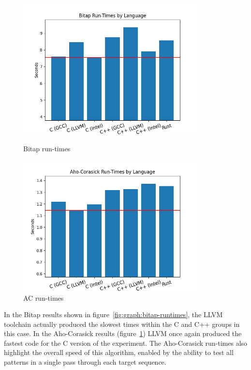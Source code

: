 \begin{figure}[ht]
    \centering
    \begin{minipage}[t]{0.45\textwidth}
        \centering
        \includegraphics[width=0.85\textwidth]{figures/algorithm_runtimes-shift_or.png}
        \caption{Bitap run-times}
        \label{fig:graph:bitap-runtimes}
    \end{minipage}\hfill
    \begin{minipage}[t]{0.45\textwidth}
        \centering
        \includegraphics[width=0.85\textwidth]{figures/algorithm_runtimes-aho_corasick.png}
        \caption{AC run-times}
        \label{fig:graph:ac-runtimes}
    \end{minipage}
\end{figure}

In the Bitap results shown in figure~\ref{fig:graph:bitap-runtimes}, the LLVM toolchain actually produced the slowest times within the C and C++ groups in this case. In the Aho-Corasick results (figure~\ref{fig:graph:ac-runtimes}) LLVM once again produced the fastest code for the C version of the experiment. The Aho-Corasick run-times also highlight the overall speed of this algorithm, enabled by the ability to test all patterns in a single pass through each target sequence.

